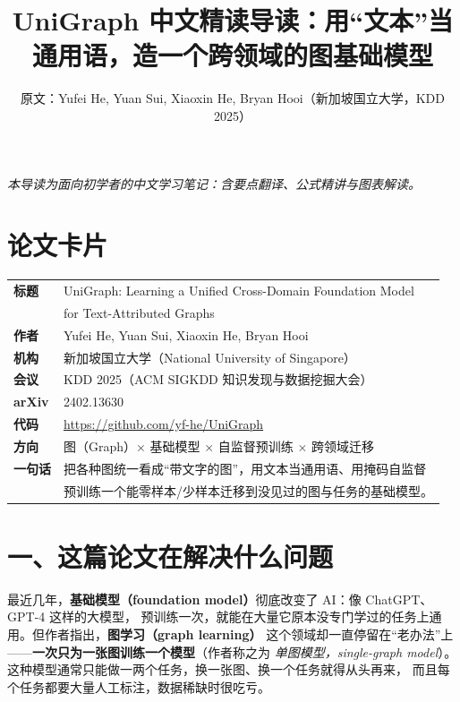 \documentclass[11pt,UTF8,fontset=fandol]{ctexart}
\title{UniGraph 中文精读导读：用“文本”当通用语，造一个跨领域的图基础模型}
\author{原文：Yufei He, Yuan Sui, Xiaoxin He, Bryan Hooi（新加坡国立大学，KDD 2025）}
\date{}
\begin{document}
\maketitle
\begin{center}\small\textit{本导读为面向初学者的中文学习笔记：含要点翻译、公式精讲与图表解读。}\end{center}

\section*{论文卡片}
\begin{center}
\begin{tabular}{@{}ll@{}}
\toprule
\textbf{标题} & UniGraph: Learning a Unified Cross-Domain Foundation Model \\
            & for Text-Attributed Graphs \\
\textbf{作者} & Yufei He, Yuan Sui, Xiaoxin He, Bryan Hooi \\
\textbf{机构} & 新加坡国立大学（National University of Singapore） \\
\textbf{会议} & KDD 2025（ACM SIGKDD 知识发现与数据挖掘大会） \\
\textbf{arXiv} & 2402.13630 \\
\textbf{代码} & \url{https://github.com/yf-he/UniGraph} \\
\textbf{方向} & 图（Graph）$\times$ 基础模型 $\times$ 自监督预训练 $\times$ 跨领域迁移 \\
\textbf{一句话} & 把各种图统一看成“带文字的图”，用文本当通用语、用掩码自监督 \\
              & 预训练一个能零样本/少样本迁移到没见过的图与任务的基础模型。 \\
\bottomrule
\end{tabular}
\end{center}

\section{一、这篇论文在解决什么问题}

最近几年，\textbf{基础模型（foundation model）}彻底改变了 AI：像 ChatGPT、GPT-4 这样的大模型，
预训练一次，就能在大量它原本没专门学过的任务上通用。但作者指出，\textbf{图学习（graph learning）}
这个领域却一直停留在“老办法”上——\textbf{一次只为一张图训练一个模型}（作者称之为
\emph{单图模型，single-graph model}）。这种模型通常只能做一两个任务，换一张图、换一个任务就得从头再来，
而且每个任务都要大量人工标注，数据稀缺时很吃亏。
\end{document}
